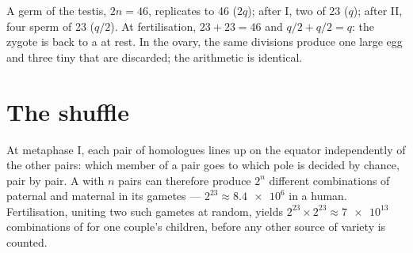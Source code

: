 \begin{example}\label{ex:g12:meiosis-genetic-shuffling:numbers}
A germ  of the testis, $2n = 46$, replicates to 46 
 ($2q$); after  I, two  of 23 
 ($q$); after  II, four sperm  of 23
  ($q/2$). At fertilisation, $23 + 23 =
46$ and $q/2 + q/2 = q$: the zygote is back to a   at rest.
In the ovary, the same divisions produce one large egg  and three
tiny  that are discarded; the arithmetic is identical.
\end{example}

\section{The shuffle}

\begin{proposition}\label{prop:g12:meiosis-genetic-shuffling:assortment}
At metaphase I, each pair of homologues lines up on the equator
independently of the other pairs: which member of a pair goes to which
pole is decided by chance, pair by pair. A  with $n$ pairs can
therefore produce $2^n$ different combinations of paternal and maternal
 in its gametes --- $2^{23} \approx \num{8.4e6}$ in a human.
Fertilisation, uniting two such gametes at random, yields $2^{23}
\times 2^{23} \approx \num{7e13}$ combinations of  for one
couple's children, before any other source of variety is counted.
\end{proposition}
\admitted

